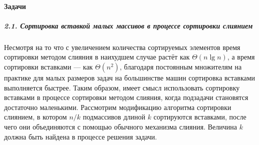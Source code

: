 \paragraph{Задачи}

\subparagraph{2.1. Сортировка вставкой малых массивов в процессе сортировки слиянием}

Несмотря на то что с увеличением количества сортируемых элементов время сортировки методом слияния в наихудшем случае растёт как $\Theta(n \lg n)$,
а время сортировки вставками --- как $\Theta(n^2)$, благодаря постоянным множителям
на практике для малых размеров задач на большинстве машин сортировка вставками выполняется быстрее.
Таким образом, имеет смысл использовать сортировку вставками в процессе сортировки методом слияния, когда подзадачи становятся достаточно маленькими.
Рассмотрим модификацию алгоритма сортировки слиянием,
в котором $n/k$ подмассивов длиной $k$ сортируются вставками, после чего они объединяются с помощью обычного механизма слияния.
Величина $k$ должна быть найдена в процессе решения задачи.

